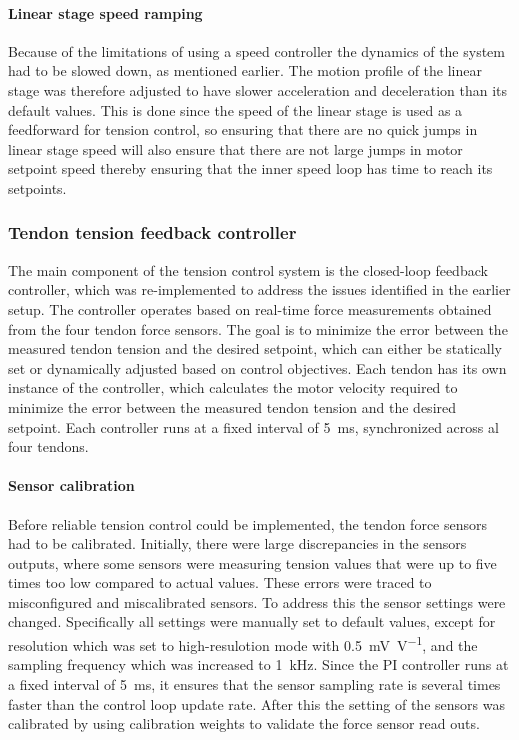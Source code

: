 \paragraph*{Linear stage speed ramping}
Because of the limitations of using a speed controller the dynamics of the system had to be slowed down, as mentioned earlier. The motion profile of the linear stage was therefore adjusted to have slower acceleration and deceleration than its default values. This is done since the speed of the linear stage is used as a feedforward for tension control, so ensuring that there are no quick jumps in linear stage speed will also ensure that there are not large jumps in motor setpoint speed thereby ensuring that the inner speed loop has time to reach its setpoints.

\subsubsection{Tendon tension feedback controller}
The main component of the tension control system is the closed-loop feedback controller, which was re-implemented to address the issues identified in the earlier setup. The controller operates based on real-time force measurements obtained from the four tendon force sensors. The goal is to minimize the error between the measured tendon tension and the desired setpoint, which can either be statically set or dynamically adjusted based on control objectives. 
\newline \newline
Each tendon has its own instance of the controller, which calculates the motor velocity required to minimize the error between the measured tendon tension and the desired setpoint. Each controller runs at a fixed interval of \SI{5}{\milli \second}, synchronized across al four tendons. 

\paragraph*{Sensor calibration}
Before reliable tension control could be implemented, the tendon force sensors had to be calibrated. Initially, there were large discrepancies in the sensors outputs, where some sensors were measuring tension values that were up to five times too low compared to actual values. These errors were traced to misconfigured and miscalibrated sensors. To address this the sensor settings were changed. Specifically all settings were manually set to default values, except for resolution which was set to high-resulotion mode with  \SI{0.5}{\milli\volt\per\volt}, and the sampling frequency which was increased to \SI{1}{\kilo\hertz}. Since the PI controller runs at a fixed interval of \SI{5}{\milli\second}, it ensures that the sensor sampling rate is several times faster than the control loop update rate. After this the setting of the sensors was calibrated by using calibration weights to validate the force sensor read outs.

